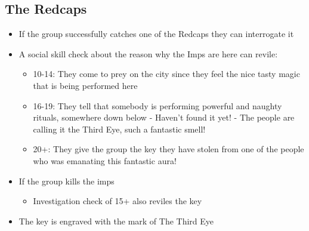 \subsection*{The Redcaps}
\label{subadv:the_redcaps}
\begin{itemize}
    \item If the group successfully catches one of the Redcaps they can interrogate it 
    \item A social skill check about the reason why the Imps are here can revile:
    \begin{itemize}
        \item  10-14: They come to prey on the city since they feel the nice tasty magic that is being performed here
        \item 16-19: They tell that somebody is performing powerful and naughty rituals, somewhere down below - Haven't found it yet! - The people are calling it the Third Eye, such a fantastic smell!
        \item 20+: They give the group the key they have stolen from one of the people who was emanating this fantastic aura!
    \end{itemize}
    \item If the group kills the imps
    \begin{itemize}
        \item Investigation check of 15+ also reviles the key
    \end{itemize}
    \item The key is engraved with the mark of The Third Eye
\end{itemize}

